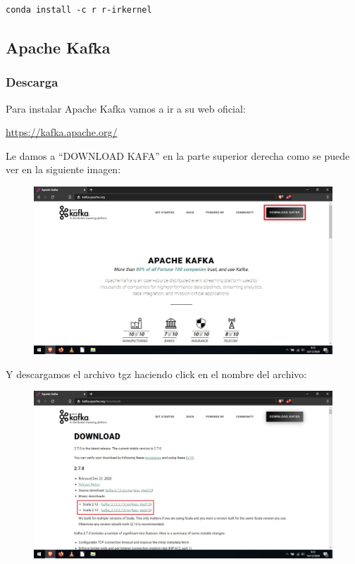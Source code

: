 \documentclass[a4paper,10pt]{article}
\begin{document}
\lstset{language=bash, breaklines=true, basicstyle=\ttfamily}
\begin{lstlisting}[frame=single]
conda install -c r r-irkernel
\end{lstlisting}

\clearpage

\subsection{Apache Kafka}

\subsubsection{Descarga}

Para instalar Apache Kafka vamos a ir a su web oficial:

\begin{center}
\href{https://kafka.apache.org/}{https://kafka.apache.org/}  
\end{center}

Le damos a “DOWNLOAD KAFA” en la parte superior derecha como se puede ver en la siguiente imagen: 

\begin{figure}[H]
\begin{center}
\includegraphics[width=450pt]{./fotos/Kafka/01 (V).jpg}
\end{center}
\end{figure}

Y descargamos el archivo tgz haciendo click en el nombre del archivo: 

\begin{figure}[H]
\begin{center}
\includegraphics[width=450pt]{./fotos/Kafka/02 (V).jpg}
\end{center}
\end{figure} 
\end{document}
